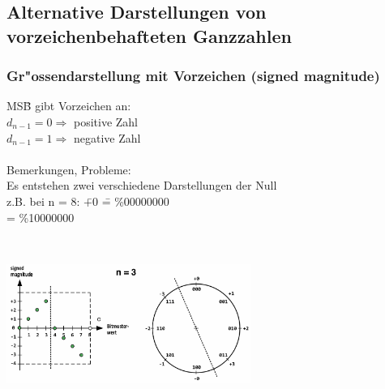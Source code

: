 \subsection{Alternative Darstellungen von vorzeichenbehafteten Ganzzahlen}
\subsubsection{Gr"ossendarstellung mit Vorzeichen (signed magnitude)}
\vspace{-2ex}
\begin{minipage}{9cm}
	\begin{tabbing}
		MS\=B gibt  Vorzeichen an:\\
		\> $d_{n-1} = 0 \Rightarrow$ positive Zahl\\
		\> $d_{n-1} = 1 \Rightarrow$ negative Zahl\\\\
		
		Bemerkungen, Probleme:\\
		\> Es entstehen zwei verschiedene Darstellungen der Null\\
		\> z.B. bei n = 8: \= +0 \= = \%00000000\\
						\> \> -0 \> = \%10000000
		
	\end{tabbing}
\end{minipage}
%
\begin{minipage}{0.5cm}
	\ \
\end{minipage}
%
\begin{minipage}{9cm}
	\includegraphics[width=8cm]{pics/Signed_Magnitude}
\end{minipage}

